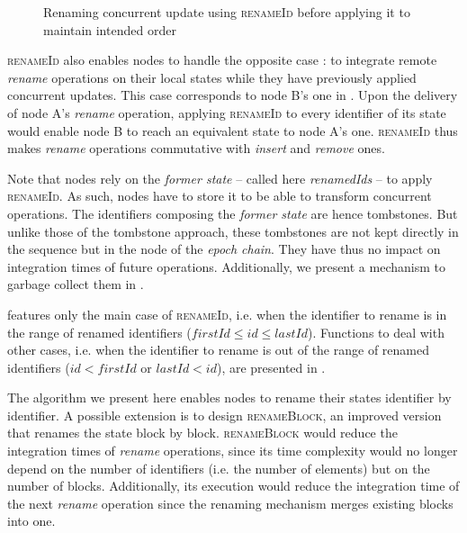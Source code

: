 \documentclass[10pt,journal,compsoc]{IEEEtran}
\let\MYoriglatexcaption\caption
\renewcommand{\caption}[2][\relax]{\MYoriglatexcaption[#2]{#2}}
\newcommand{\ie}{i.e. }
\newcommand{\trm}[1]{\mathit{#1}}
\begin{document}
\begin{figure}[!ht]
\begin{tikzpicture}
    \end{tikzpicture}
    \caption{Renaming concurrent update using \textsc{renameId} before applying it to maintain intended order}
    \label{fig:concurrent-insert-rename-fixed}
\end{figure}

\textsc{renameId} also enables nodes to handle the opposite case : to integrate remote \emph{rename} operations on their local states while they have previously applied concurrent updates.
This case corresponds to node B's one in .
Upon the delivery of node A's \emph{rename} operation, applying \textsc{renameId} to every identifier of its state would enable node B to reach an equivalent state to node A's one.
\textsc{renameId} thus makes \emph{rename} operations commutative with \emph{insert} and \emph{remove} ones.

Note that nodes rely on the \emph{former state} -- called here \emph{renamedIds} -- to apply \textsc{renameId}.
As such, nodes have to store it to be able to transform concurrent operations.
The identifiers composing the \emph{former state} are hence tombstones.
But unlike those of the tombstone approach, these tombstones are not kept directly in the sequence but in the node of the \emph{epoch chain}.
They have thus no impact on integration times of future operations.
Additionally, we present a mechanism to garbage collect them in .

 features only the main case of \textsc{renameId}, \ie when the identifier to rename is in the range of renamed identifiers ($\trm{firstId} \leq \trm{id} \leq \trm{lastId}$).
Functions to deal with other cases, \ie when the identifier to rename is out of the range of renamed identifiers ($\trm{id} < \trm{firstId}$ or $\trm{lastId} < \trm{id}$), are presented in .

The algorithm we present here enables nodes to rename their states identifier by identifier.
A possible extension is to design \textsc{renameBlock}, an improved version that renames the state block by block.
\textsc{renameBlock} would reduce the integration times of \emph{rename} operations, since its time complexity would no longer depend on the number of identifiers (\ie the number of elements) but on the number of blocks.
Additionally, its execution would reduce the integration time of the next \emph{rename} operation since the renaming mechanism merges existing blocks into one.
\end{document}
